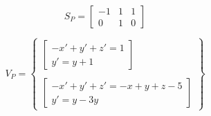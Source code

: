 \begin{center}
	\begin{minipage}{0.3\linewidth}
		\begin{equation*}
		S_P = 
			\begin{bmatrix}
				-1 & 1 & 1 \\
				0 & 1 & 0
			\end{bmatrix}
		\end{equation*}
	\end{minipage}
	\begin{minipage}{0.6\linewidth}
		\begin{equation*}
		    V_P = \begin{Bmatrix}
		              \begin{bmatrix}
		                    -x' + y' + z' = 1 \\
		                    y' = y + 1
		               \end{bmatrix} \\ \\
		               \begin{bmatrix}
		                     -x' + y' + z' = -x + y + z - 5 \\
		                    y' = y - 3y
		               \end{bmatrix}
		    \end{Bmatrix}
		\end{equation*}
	\end{minipage}
\end{center}
